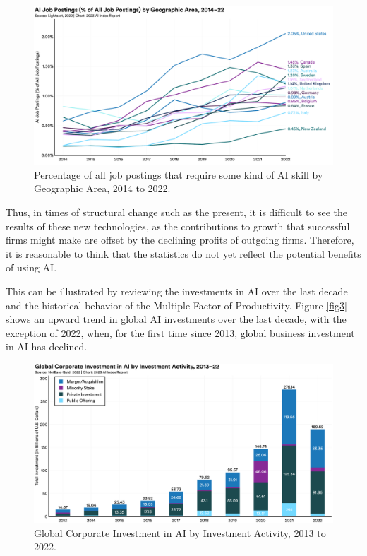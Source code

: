 \documentclass[preprint, 3p,
authoryear]{elsarticle} %
\begin{document}
\begin{figure}

{\centering \includegraphics[width=0.7\linewidth]{../Views/AI_job_postings_by_geo_area} 

}

\caption{\label{fig2} Percentage of all job postings that require some kind of AI skill by Geographic Area, 2014 to 2022.}\label{fig:fig2}
\end{figure}

Thus, in times of structural change such as the present, it is difficult
to see the results of these new technologies, as the contributions to
growth that successful firms might make are offset by the declining
profits of outgoing firms. Therefore, it is reasonable to think that the
statistics do not yet reflect the potential benefits of using AI.

This can be illustrated by reviewing the investments in AI over the last
decade and the historical behavior of the Multiple Factor of
Productivity. Figure \ref{fig3} shows an upward trend in global AI
investments over the last decade, with the exception of 2022, when, for
the first time since 2013, global business investment in AI has
declined.

\begin{figure}

{\centering \includegraphics[width=0.7\linewidth]{../Views/global_investiment_by_inv_activity} 

}

\caption{\label{fig3}Global Corporate Investment in AI by Investment Activity, 2013 to 2022.}\label{fig:fig3}
\end{figure}
\end{document}
